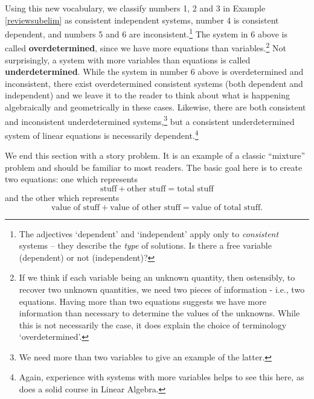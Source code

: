 \documentclass{ximera}
\begin{document}
Using this new vocabulary, we classify numbers 1, 2 and 3 in Example \ref{reviewsubelim} as consistent independent systems, number 4 is consistent dependent, and numbers 5 and 6 are inconsistent.\footnote{The adjectives `dependent' and `independent' apply only to \textit{consistent} systems -- they describe the \textit{type} of solutions.  Is there a free variable (dependent) or not (independent)?}  The system in 6 above is called \textbf{overdetermined}, since we have more equations  than variables.\footnote{If we think if each variable being an unknown quantity, then ostensibly, to recover two unknown quantities, we need two pieces of information - i.e., two equations.  Having more than two equations suggests we have more information than necessary to determine the values of the unknowns.  While this is not necessarily the case, it does explain the choice of terminology `overdetermined'.}  Not surprisingly, a system with more variables than equations is called \textbf{underdetermined}.  While the system in number 6 above is overdetermined and inconsistent, there exist overdetermined consistent systems (both dependent and independent) and we leave it to the reader to think about what is happening algebraically and geometrically in these cases.  Likewise, there are both consistent and inconsistent underdetermined systems,\footnote{We need more than two variables to give an example of the latter.} but a consistent underdetermined system of linear equations is necessarily dependent.\footnote{Again, experience with systems with more variables helps to see this here, as does a solid course in Linear Algebra.}  

 

We end this section with a story problem.  It is an example of a classic ``mixture'' problem and should be familiar to most readers.  The basic goal here is to create two equations: one which represents \[\text{stuff} + \text{other stuff} = \text{total stuff}\] and the other which represents \[\text{value of stuff} + \text{value of other stuff} =  \text{value of total stuff.}\] 
 
\end{document}
